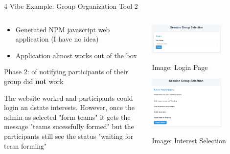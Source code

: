 \documentclass[xcolor=dvipsnames, aspectratio=169]{beamer}
\begin{document}
\begin{frame}{4 Vibe Example: Group Organization Tool 2}
  \begin{columns}[T]
    \begin{column}{0.5\textwidth}
      \begin{itemize}
          \item Generated NPM javascript web application (I have no idea)
          \item Application almost works out of the box
      \end{itemize}
      \begin{alertbox}\small
          Phase 2: of notifying participants of their group did \textbf{not} work
      \end{alertbox}
      \begin{promptbox}\small
        The website worked and participants could login an dstate interests. However, once the admin as selected "form teams" it gets the message "teams sucessfully formed" but the participants still see the status "waiting for team forming"
      \end{promptbox}
    \end{column}
    \begin{column}{0.5\textwidth}
        
      \centering\includegraphics[width=0.7\textwidth]{images/GroupOrg.png}
      \tiny\centerline{Image: Login Page}
      \centering\includegraphics[width=0.7\textwidth]{images/GroupOrg2.png}
      \tiny\centerline{Image: Interest Selection}
    \end{column}
  \end{columns}
\end{frame}
\end{document}
